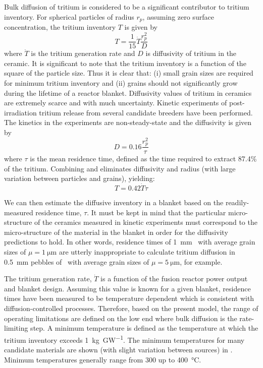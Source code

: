 \documentclass[11pt]{report} %
\newcommand{\lit}{\ce{Li2TiO3}}
\newcommand{\lis}{\ce{Li4SiO4}}
\begin{document}
Bulk diffusion of tritium is considered to be a significant contributor to tritium inventory. For spherical particles of radius $r_p$, assuming zero surface concentration, the tritium inventory $T$ is given by 
\begin{equation}\label{eq:inventory-diff}
T = \frac{1}{15}\dot{T}\frac{r_p^2}{D}
\end{equation}
where $\dot{T}$ is the tritium generation rate and $D$ is diffusivity of tritium in the ceramic. It is significant to note that the tritium inventory is a function of the square of the particle size. Thus it is clear that: (i) small grain sizes are required for minimum tritium inventory and (ii) grains should not significantly grow during the lifetime of a reactor blanket. Diffusivity values of tritium in ceramics are extremely scarce and with much uncertainty. Kinetic experiments of post-irradiation tritium release from several candidate breeders have been performed. The kinetics in the experiments are non-steady-state and the diffusivity is given by 
\begin{equation}\label{eq:exp-diff}
D = 0.16 \frac{r_p^2}{\tau}
\end{equation}
where $\tau$ is the mean residence time, defined as the time required to extract 87.4\% of the tritium. Combining  and  eliminates diffusivity and radius (with large variation between particles and grains), yielding:
\begin{equation}
T = 0.42 \dot{T}\tau
\end{equation}

We can then estimate the diffusive inventory in a blanket based on the readily-measured residence time, $\tau$. It must be kept in mind that the particular micro-structure of the ceramics measured in kinetic experiments must correspond to the micro-structure of the material in the blanket in order for the diffusivity predictions to hold. In other words, residence times of \SI{1}{\milli\meter} \lit~with average grain sizes of $\mu = \SI{1}{\micro\meter}$ are utterly inappropriate to calculate tritium diffusion in \SI{0.5}{\milli\meter} pebbles of \lis~with average grain sizes of $\mu = \SI{5}{\micro\meter}$, for example.

The tritium generation rate, $\dot{T}$ is a function of the fusion reactor power output and blanket design. Assuming this value is known for a given blanket, residence times have been measured to be temperature dependent which is consistent with diffusion-controlled processes. Therefore, based on the present model, the range of operating limitations are defined on the low end where bulk diffusion is the rate-limiting step. A minimum temperature is defined as the temperature at which the tritium inventory exceeds \SI{1}{\kilo\gram\per\giga\watt}. The minimum temperatures for many candidate materials are shown (with slight variation between sources) in . Minimum temperatures generally range from 300 up to \SI{400}{\celsius}.
\end{document}
